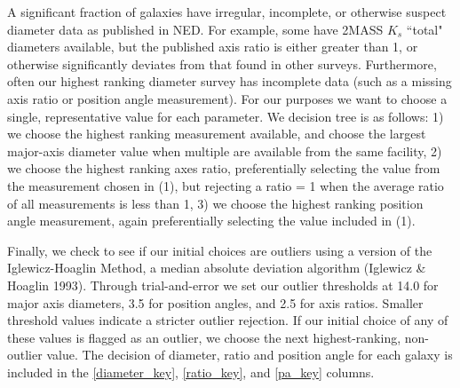 \documentclass[iop]{emulateapj-rtx4}
\begin{document}
A significant fraction of galaxies have irregular, incomplete, or otherwise suspect diameter data as published in NED. For example, some have 2MASS $K_s$ ``total" diameters available, but the published axis ratio is either greater than 1, or otherwise significantly deviates from that found in other surveys. Furthermore, often our highest ranking diameter survey has incomplete data (such as a missing axis ratio or position angle measurement). For our purposes we want to choose a single, representative value for each parameter. We decision tree is as follows: 1) we choose the highest ranking measurement available, and choose the largest major-axis diameter value when multiple are available from the same facility, 2) we choose the highest ranking axes ratio, preferentially selecting the value from the measurement chosen in (1), but rejecting a ratio = 1 when the average ratio of all measurements is less than 1, 3) we choose the highest ranking position angle measurement, again preferentially selecting the value included in (1). 

Finally, we check to see if our initial choices are outliers using a version of the Iglewicz-Hoaglin Method, a median absolute deviation algorithm (Iglewicz \& Hoaglin 1993). Through trial-and-error we set our outlier thresholds at 14.0 for major axis diameters, 3.5 for position angles, and 2.5 for axis ratios. Smaller threshold values indicate a stricter outlier rejection. If our initial choice of any of these values is flagged as an outlier, we choose the next highest-ranking, non-outlier value. The decision of diameter, ratio and position angle for each galaxy is included in the \ref{diameter_key}, \ref{ratio_key}, and \ref{pa_key} columns.


\end{document}
